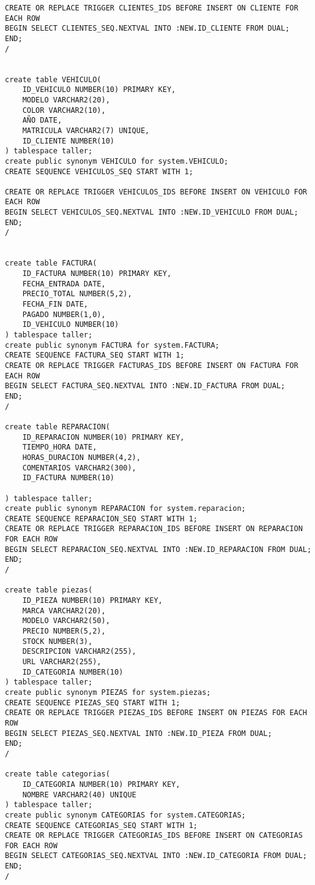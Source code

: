 \begin{lstlisting}[caption=Script .sql para crear la BD (BBDD)]
CREATE OR REPLACE TRIGGER CLIENTES_IDS BEFORE INSERT ON CLIENTE FOR EACH ROW
BEGIN SELECT CLIENTES_SEQ.NEXTVAL INTO :NEW.ID_CLIENTE FROM DUAL;
END;
/


create table VEHICULO(
    ID_VEHICULO NUMBER(10) PRIMARY KEY,
    MODELO VARCHAR2(20),
    COLOR VARCHAR2(10),
    AÑO DATE,
    MATRICULA VARCHAR2(7) UNIQUE,
    ID_CLIENTE NUMBER(10)
) tablespace taller;
create public synonym VEHICULO for system.VEHICULO;
CREATE SEQUENCE VEHICULOS_SEQ START WITH 1;

CREATE OR REPLACE TRIGGER VEHICULOS_IDS BEFORE INSERT ON VEHICULO FOR EACH ROW
BEGIN SELECT VEHICULOS_SEQ.NEXTVAL INTO :NEW.ID_VEHICULO FROM DUAL;
END;
/


create table FACTURA(
    ID_FACTURA NUMBER(10) PRIMARY KEY,
    FECHA_ENTRADA DATE,
    PRECIO_TOTAL NUMBER(5,2),
    FECHA_FIN DATE,
    PAGADO NUMBER(1,0),
    ID_VEHICULO NUMBER(10)
) tablespace taller;
create public synonym FACTURA for system.FACTURA;
CREATE SEQUENCE FACTURA_SEQ START WITH 1;
CREATE OR REPLACE TRIGGER FACTURAS_IDS BEFORE INSERT ON FACTURA FOR EACH ROW
BEGIN SELECT FACTURA_SEQ.NEXTVAL INTO :NEW.ID_FACTURA FROM DUAL;
END;
/

create table REPARACION(
    ID_REPARACION NUMBER(10) PRIMARY KEY,
    TIEMPO_HORA DATE,
    HORAS_DURACION NUMBER(4,2),
    COMENTARIOS VARCHAR2(300),
    ID_FACTURA NUMBER(10)

) tablespace taller;
create public synonym REPARACION for system.reparacion;
CREATE SEQUENCE REPARACION_SEQ START WITH 1;
CREATE OR REPLACE TRIGGER REPARACION_IDS BEFORE INSERT ON REPARACION FOR EACH ROW
BEGIN SELECT REPARACION_SEQ.NEXTVAL INTO :NEW.ID_REPARACION FROM DUAL;
END;
/

create table piezas(
    ID_PIEZA NUMBER(10) PRIMARY KEY,
    MARCA VARCHAR2(20),
    MODELO VARCHAR2(50),
    PRECIO NUMBER(5,2),
    STOCK NUMBER(3),
    DESCRIPCION VARCHAR2(255),
    URL VARCHAR2(255),
    ID_CATEGORIA NUMBER(10)
) tablespace taller;
create public synonym PIEZAS for system.piezas;
CREATE SEQUENCE PIEZAS_SEQ START WITH 1;
CREATE OR REPLACE TRIGGER PIEZAS_IDS BEFORE INSERT ON PIEZAS FOR EACH ROW
BEGIN SELECT PIEZAS_SEQ.NEXTVAL INTO :NEW.ID_PIEZA FROM DUAL;
END;
/

create table categorias(
    ID_CATEGORIA NUMBER(10) PRIMARY KEY,
    NOMBRE VARCHAR2(40) UNIQUE
) tablespace taller;
create public synonym CATEGORIAS for system.CATEGORIAS;
CREATE SEQUENCE CATEGORIAS_SEQ START WITH 1;
CREATE OR REPLACE TRIGGER CATEGORIAS_IDS BEFORE INSERT ON CATEGORIAS FOR EACH ROW
BEGIN SELECT CATEGORIAS_SEQ.NEXTVAL INTO :NEW.ID_CATEGORIA FROM DUAL;
END;
/


\end{lstlisting}
